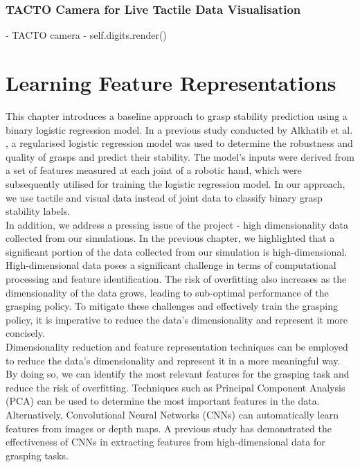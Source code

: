 \documentclass[11pt, a4paper]{report}
\begin{document}
\subsection{TACTO Camera for Live Tactile Data Visualisation}
\label{sec:}
- TACTO camera \cite{Wang2022TACTO}
- self.digits.render()



\chapter{Learning Feature Representations}
\label{chap:4}
This chapter introduces a baseline approach to grasp stability prediction using a binary logistic regression model. In a previous study conducted by Alkhatib et al. \cite{9091340}, a regularised logistic regression model was used to determine the robustness and quality of grasps and predict their stability. The model's inputs were derived from a set of features measured at each joint of a robotic hand, which were subsequently utilised for training the logistic regression model. In our approach, we use tactile and visual data instead of joint data to classify binary grasp stability labels.\\

In addition, we address a pressing issue of the project - high dimensionality data collected from our simulations. In the previous chapter, we highlighted that a significant portion of the data collected from our simulation is high-dimensional. High-dimensional data poses a significant challenge in terms of computational processing and feature identification. The risk of overfitting also increases as the dimensionality of the data grows, leading to sub-optimal performance of the grasping policy. To mitigate these challenges and effectively train the grasping policy, it is imperative to reduce the data's dimensionality and represent it more concisely.\\

Dimensionality reduction and feature representation techniques can be employed to reduce the data's dimensionality and represent it in a more meaningful way. By doing so, we can identify the most relevant features for the grasping task and reduce the risk of overfitting. Techniques such as Principal Component Analysis (PCA) can be used to determine the most important features in the data. Alternatively, Convolutional Neural Networks (CNNs) can automatically learn features from images or depth maps. A previous study \cite{Calandra_2018} has demonstrated the effectiveness of CNNs in extracting features from high-dimensional data for grasping tasks.\\
\end{document}
